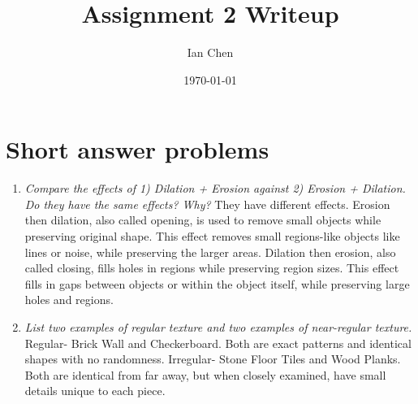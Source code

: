 \documentclass[11pt]{article}
\title{Assignment 2 Writeup}
\author{Ian Chen}
\date{\today}
\begin{document}
    \maketitle


    \section{Short answer problems}

    \begin{enumerate}
        \item \textit{Compare the effects of 1) Dilation + Erosion against 2) Erosion + Dilation. Do they have the same
        effects? Why?}\newline
        They have different effects. Erosion then dilation, also called opening, is used to
        remove small objects while preserving original shape. This effect removes small regions-like objects like lines
        or noise, while preserving the larger areas. Dilation then erosion, also called closing, fills holes in regions
        while preserving region sizes. This effect fills in gaps between objects or within the object itself, while
        preserving large holes and regions.\newline

        \item \textit{List two examples of regular texture and two examples of near-regular texture.}\newline
        Regular- Brick Wall and Checkerboard. Both are exact patterns and identical shapes with no randomness.\newline
        Irregular- Stone Floor Tiles and Wood Planks. Both are identical from far away, but when closely examined, have
        small details unique to each piece.\newline


\end{enumerate}
\end{document}
